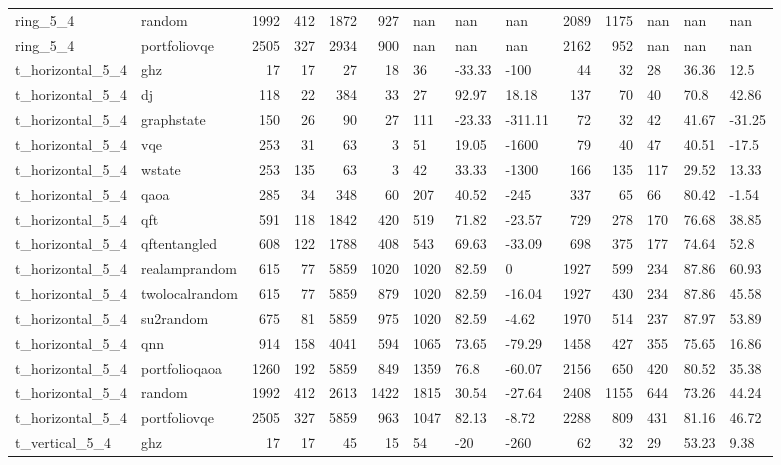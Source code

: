 \begin{longtable}{llrrrrlllrrlll}
ring\_5\_4 & random & 1992 & 412 & 1872 & 927 & nan & nan & nan & 2089 & 1175 & nan & nan & nan \\
ring\_5\_4 & portfoliovqe & 2505 & 327 & 2934 & 900 & nan & nan & nan & 2162 & 952 & nan & nan & nan \\
t\_horizontal\_5\_4 & ghz & 17 & 17 & 27 & 18 & 36 & -33.33 & -100 & 44 & 32 & 28 & 36.36 & 12.5 \\
t\_horizontal\_5\_4 & dj & 118 & 22 & 384 & 33 & 27 & 92.97 & 18.18 & 137 & 70 & 40 & 70.8 & 42.86 \\
t\_horizontal\_5\_4 & graphstate & 150 & 26 & 90 & 27 & 111 & -23.33 & -311.11 & 72 & 32 & 42 & 41.67 & -31.25 \\
t\_horizontal\_5\_4 & vqe & 253 & 31 & 63 & 3 & 51 & 19.05 & -1600 & 79 & 40 & 47 & 40.51 & -17.5 \\
t\_horizontal\_5\_4 & wstate & 253 & 135 & 63 & 3 & 42 & 33.33 & -1300 & 166 & 135 & 117 & 29.52 & 13.33 \\
t\_horizontal\_5\_4 & qaoa & 285 & 34 & 348 & 60 & 207 & 40.52 & -245 & 337 & 65 & 66 & 80.42 & -1.54 \\
t\_horizontal\_5\_4 & qft & 591 & 118 & 1842 & 420 & 519 & 71.82 & -23.57 & 729 & 278 & 170 & 76.68 & 38.85 \\
t\_horizontal\_5\_4 & qftentangled & 608 & 122 & 1788 & 408 & 543 & 69.63 & -33.09 & 698 & 375 & 177 & 74.64 & 52.8 \\
t\_horizontal\_5\_4 & realamprandom & 615 & 77 & 5859 & 1020 & 1020 & 82.59 & 0 & 1927 & 599 & 234 & 87.86 & 60.93 \\
t\_horizontal\_5\_4 & twolocalrandom & 615 & 77 & 5859 & 879 & 1020 & 82.59 & -16.04 & 1927 & 430 & 234 & 87.86 & 45.58 \\
t\_horizontal\_5\_4 & su2random & 675 & 81 & 5859 & 975 & 1020 & 82.59 & -4.62 & 1970 & 514 & 237 & 87.97 & 53.89 \\
t\_horizontal\_5\_4 & qnn & 914 & 158 & 4041 & 594 & 1065 & 73.65 & -79.29 & 1458 & 427 & 355 & 75.65 & 16.86 \\
t\_horizontal\_5\_4 & portfolioqaoa & 1260 & 192 & 5859 & 849 & 1359 & 76.8 & -60.07 & 2156 & 650 & 420 & 80.52 & 35.38 \\
t\_horizontal\_5\_4 & random & 1992 & 412 & 2613 & 1422 & 1815 & 30.54 & -27.64 & 2408 & 1155 & 644 & 73.26 & 44.24 \\
t\_horizontal\_5\_4 & portfoliovqe & 2505 & 327 & 5859 & 963 & 1047 & 82.13 & -8.72 & 2288 & 809 & 431 & 81.16 & 46.72 \\
t\_vertical\_5\_4 & ghz & 17 & 17 & 45 & 15 & 54 & -20 & -260 & 62 & 32 & 29 & 53.23 & 9.38 \\

\end{longtable}

